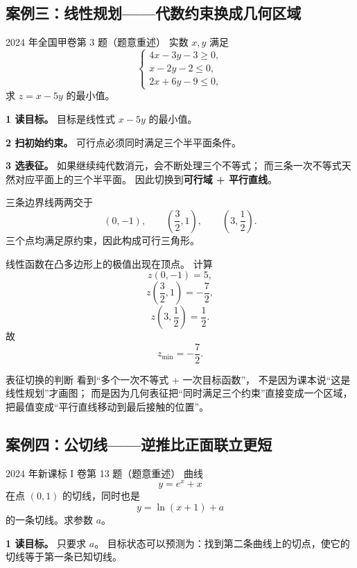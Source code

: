 \documentclass[11pt,a4paper]{ctexart}
\begin{document}
\subsection{案例三：线性规划——代数约束换成几何区域}

\begin{examplebox}{2024 年全国甲卷第 3 题（题意重述）}
实数 $x,y$ 满足
\[
\begin{cases}
4x-3y-3\ge0,\\
x-2y-2\le0,\\
2x+6y-9\le0,
\end{cases}
\]
求 $z=x-5y$ 的最小值。
\end{examplebox}

\textbf{1 读目标。}
目标是线性式 $x-5y$ 的最小值。

\textbf{2 扫初始约束。}
可行点必须同时满足三个半平面条件。

\textbf{3 选表征。}
如果继续纯代数消元，会不断处理三个不等式；
而三条一次不等式天然对应平面上的三个半平面。
因此切换到\textbf{可行域 + 平行直线}。

三条边界线两两交于
\[
(0,-1),\qquad
\left(\frac32,1\right),\qquad
\left(3,\frac12\right).
\]
三个点均满足原约束，因此构成可行三角形。

线性函数在凸多边形上的极值出现在顶点。
计算
\[
z(0,-1)=5,
\]
\[
z\left(\frac32,1\right)=-\frac72,
\]
\[
z\left(3,\frac12\right)=\frac12.
\]
故
\[
\boxed{z_{\min}=-\frac72}.
\]

\begin{trainingbox}{表征切换的判断}
看到“多个一次不等式 + 一次目标函数”，
不是因为课本说“这是线性规划”才画图；
而是因为几何表征把“同时满足三个约束”直接变成一个区域，
把最值变成“平行直线移动到最后接触的位置”。
\end{trainingbox}

\subsection{案例四：公切线——逆推比正面联立更短}

\begin{examplebox}{2024 年新课标 I 卷第 13 题（题意重述）}
曲线
\[
y=e^x+x
\]
在点 $(0,1)$ 的切线，同时也是
\[
y=\ln(x+1)+a
\]
的一条切线。求参数 $a$。
\end{examplebox}

\textbf{1 读目标。}
只要求 $a$。
目标状态可以预测为：找到第二条曲线上的切点，使它的切线等于第一条已知切线。
\end{document}

